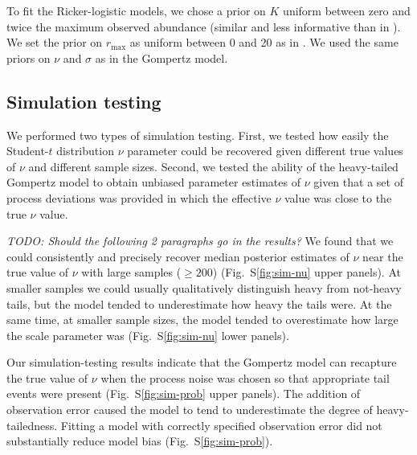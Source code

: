 To fit the Ricker-logistic models, we chose a prior on \(K\) uniform between
zero and twice the maximum observed abundance (similar and less informative
than in \citet{delean2013}). We set the prior on
\(r_\mathrm{max}\) as uniform between 0 and 20 as in \citet{delean2013}. We used the same priors on \(\nu\) and \(\sigma\) as in
the Gompertz model.

\subsection{Simulation testing}
We performed two types of simulation testing.
First, we tested how easily the Student-$t$ distribution \(\nu\) parameter could
be recovered given different true values of \(\nu\) and different sample sizes.
Second, we tested the ability of the heavy-tailed Gompertz model to obtain
unbiased parameter estimates of \(\nu\) given that a set of process deviations
was provided in which the effective \(\nu\) value was close to the true \(\nu\)
value.

\textit{TODO: Should the following 2 paragraphs go in the results?}
We found that we could consistently and precisely recover median posterior
estimates of \(\nu\) near the true value of \(\nu\) with large samples (\(\ge
200\)) (Fig.~S\ref{fig:sim-nu} upper panels). At smaller samples we could
usually qualitatively distinguish heavy from not-heavy tails, but the model
tended to underestimate how heavy the tails were. At the same time, at smaller
sample sizes, the model tended to overestimate how large the scale parameter
was (Fig.~S\ref{fig:sim-nu} lower panels).

Our simulation-testing results indicate that the Gompertz model can recapture
the true value of \(\nu\) when the process noise was chosen so that appropriate
tail events were present (Fig.~S\ref{fig:sim-prob} upper panels). The addition
of observation error caused the model to tend to underestimate the degree of
heavy-tailedness. Fitting a model with correctly specified observation error
did not substantially reduce model bias (Fig.~S\ref{fig:sim-prob}).

